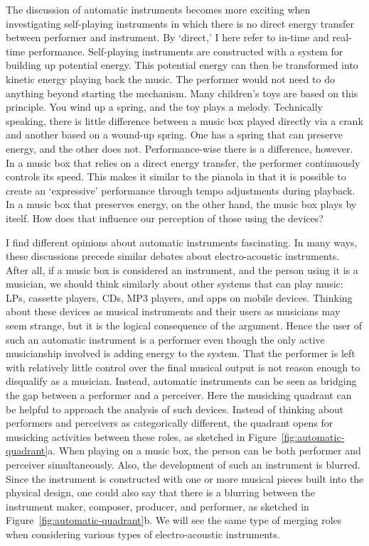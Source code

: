 The discussion of automatic instruments becomes more exciting when investigating self-playing instruments in which there is no direct energy transfer between performer and instrument. By `direct,' I here refer to in-time and real-time performance. Self-playing instruments are constructed with a system for building up potential energy. This potential energy can then be transformed into kinetic energy playing back the music. The performer would not need to do anything beyond starting the mechanism. Many children's toys are based on this principle. You wind up a spring, and the toy plays a melody. Technically speaking, there is little difference between a music box played directly via a crank and another based on a wound-up spring. One has a spring that can preserve energy, and the other does not. Performance-wise there is a difference, however. In a music box that relies on a direct energy transfer, the performer continuously controls its speed. This makes it similar to the pianola in that it is possible to create an `expressive' performance through tempo adjustments during playback. In a music box that preserves energy, on the other hand, the music box plays by itself. How does that influence our perception of those using the devices?

I find different opinions about automatic instruments fascinating. In many ways, these discussions precede similar debates about electro-acoustic instruments. After all, if a music box is considered an instrument, and the person using it is a musician, we should think similarly about other systems that can play music: LPs, cassette players, CDs, MP3 players, and apps on mobile devices. Thinking about these devices as musical instruments and their users as musicians may seem strange, but it is the logical consequence of the argument. Hence the user of such an automatic instrument is a performer even though the only active musicianship involved is adding energy to the system. That the performer is left with relatively little control over the final musical output is not reason enough to disqualify as a musician. Instead, automatic instruments can be seen as bridging the gap between a performer and a perceiver. Here the musicking quadrant can be helpful to approach the analysis of such devices. Instead of thinking about performers and perceivers as categorically different, the quadrant opens for musicking activities between these roles, as sketched in Figure~\ref{fig:automatic-quadrant}a. When playing on a music box, the person can be both performer and perceiver simultaneously. Also, the development of such an instrument is blurred. Since the instrument is constructed with one or more musical pieces built into the physical design, one could also say that there is a blurring between the instrument maker, composer, producer, and performer, as sketched in Figure~\ref{fig:automatic-quadrant}b. We will see the same type of merging roles when considering various types of electro-acoustic instruments.


